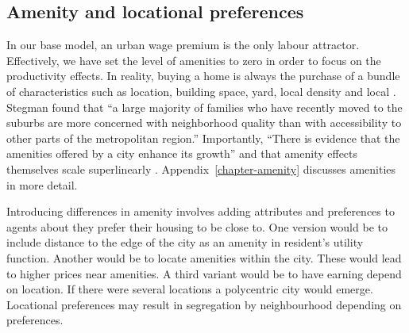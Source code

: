 

\subsection{Amenity and locational preferences}
In our base model, an urban wage premium is the only labour attractor. Effectively, we have set the level of amenities to zero in order to focus on the productivity effects. In reality, buying a home is always the purchase of a bundle of characteristics such as location, building space, yard, local density and local . Stegman found that ``a large majority of families who have recently moved to the suburbs are more concerned with neighborhood quality than with accessibility to other parts of the metropolitan region.'' Importantly, 
``There is evidence that the amenities offered by a city enhance its growth'' \cite{clarkAmenitiesDriveUrban2002, falckPhantomOperaCultural2011} and that amenity effects themselves scale superlinearly \cite{kraemerCulturalSustainabilityUS2022}.
Appendix~\ref{chapter-amenity} discusses amenities in more detail. 

Introducing differences in amenity involves adding attributes and preferences to agents about they prefer their housing to be close to.  One version would be to include distance to the edge of the city as an amenity in resident's utility function. Another would be to locate amenities within the city. These would lead to higher prices near amenities. A third variant would be to have earning depend on location. If there were several locations a polycentric city would emerge. Locational preferences may result in segregation by neighbourhood depending on preferences.



